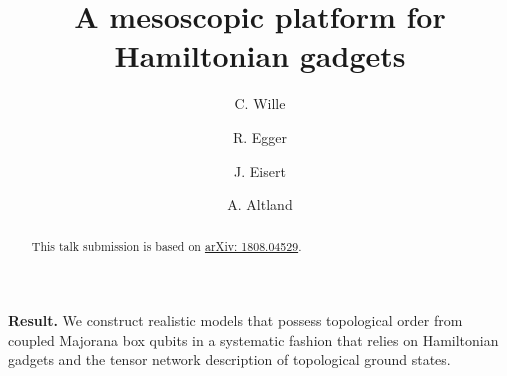 \documentclass[
onecolumn,
superscriptaddress,
amsmath,
amssymb,
notitlepage,
11pt,
tightenlines,
hyperref
]{revtex4-1}
\newcommand{\+}{\mkern2mu}
\DeclareMathOperator{\1}{\mathds{1}}
\begin{document}
\title{A mesoscopic platform for Hamiltonian gadgets}

\author{C. Wille}

\author{R. Egger}

\author{J. Eisert}

\author{A. Altland}
\begin{abstract}
This talk submission is based on \href{https://arxiv.org/abs/1808.04529}{arXiv: 1808.04529}.
\end{abstract}
\maketitle

\textbf{Result.} We construct realistic models that possess topological order from coupled Majorana box qubits in a systematic fashion that relies on Hamiltonian gadgets and the tensor network description of topological ground states. 
\end{document}
